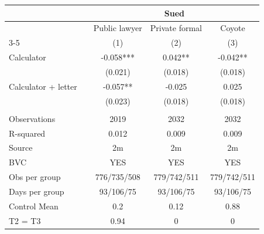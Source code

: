 \begin{tabular}{lcccc}
\toprule
      &       & \multicolumn{3}{c}{Sued} \\
\midrule
\midrule
      &       & Public lawyer & Private formal & Coyote\\
\cmidrule{3-5}      &       & (1)   & (2)   & (3) \\
\midrule
\midrule
Calculator &       & -0.058*** & 0.042** & -0.042** \\
      &       & (0.021) & (0.018) & (0.018) \\
Calculator + letter &       & -0.057** & -0.025 & 0.025 \\
      &       & (0.023) & (0.018) & (0.018) \\
      &       &       &       &  \\
\midrule
Observations &       & 2019  & 2032  & 2032 \\
R-squared &       & 0.012 & 0.009 & 0.009 \\
Source &       & 2m    & 2m    & 2m \\
BVC   &       & YES   & YES   & YES \\
Obs per group &       & 776/735/508 & 779/742/511 & 779/742/511 \\
Days per group &       & 93/106/75 & 93/106/75 & 93/106/75 \\
Control Mean &       & 0.2   & 0.12  & 0.88 \\
T2 = T3 &       & 0.94  & 0     & 0 \\
\bottomrule
\bottomrule
\end{tabular}%
